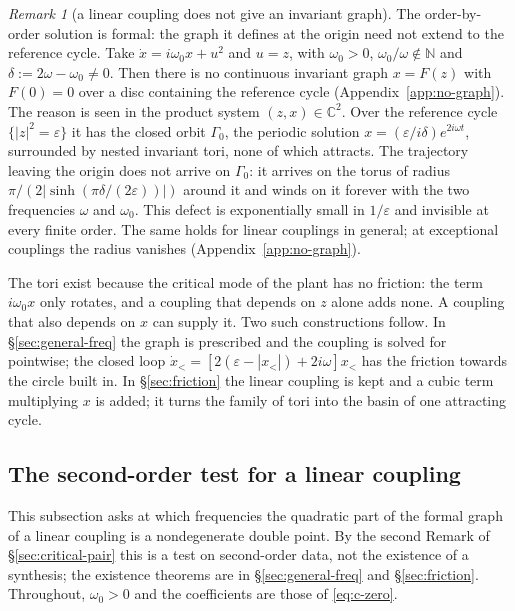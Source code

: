 \documentclass[11pt,reqno]{amsart}
\theoremstyle{plain}
\theoremstyle{definition}
\theoremstyle{remark}
\newtheorem*{remark}{Remark}
\newcommand{\C}{\mathbb{C}}
\begin{document}
\begin{remark}[a linear coupling does not give an invariant graph]\label{rem:no-graph}
The order-by-order solution is formal: the graph it defines at the origin need not extend to
the reference cycle. Take $\dot x=i\omega_0x+u^{2}$ and $u=z$, with $\omega_0>0$,
$\omega_0/\omega\notin\mathbb N$ and $\delta:=2\omega-\omega_0\neq0$. Then there is no continuous invariant
graph $x=F(z)$ with $F(0)=0$ over a disc containing the reference cycle (Appendix~\ref{app:no-graph}).
The reason is seen in the product system $(z,x)\in\C^{2}$. Over the reference cycle $\{|z|^{2}=\varepsilon\}$ it
has the closed orbit $\Gamma_0$, the periodic solution $x=(\varepsilon/i\delta)e^{2i\omega t}$, surrounded by
nested invariant tori, none of which attracts. The trajectory leaving the origin does not arrive on
$\Gamma_0$: it arrives on the torus of radius $\pi/(2|\sinh(\pi\delta/(2\varepsilon))|)$ around it and winds on
it forever with the two frequencies $\omega$ and $\omega_0$. This defect is exponentially small in
$1/\varepsilon$ and invisible at every finite order. The same holds for linear couplings in general; at exceptional couplings the radius vanishes (Appendix~\ref{app:no-graph}).

The tori exist because the critical mode of the plant has no friction: the term $i\omega_0x$ only rotates, and a
coupling that depends on $z$ alone adds none. A coupling that also depends on $x$ can supply it. Two such
constructions follow. In \S\ref{sec:general-freq} the graph is prescribed and the coupling is solved for
pointwise; the closed loop $\dot x_<=[2(\varepsilon-|x_<|)+2i\omega]x_<$ has the friction towards the circle built in. In
\S\ref{sec:friction} the linear coupling is kept and a cubic term multiplying $x$ is added; it turns the
family of tori into the basin of one attracting cycle.
\end{remark}

\subsection{The second-order test for a linear coupling}\label{sec:reachable}
This subsection asks at which frequencies the quadratic part of the formal graph of a linear
coupling is a nondegenerate double point. By the second Remark of \S\ref{sec:critical-pair} this is
a test on second-order data, not the existence of a synthesis; the existence theorems are in
\S\ref{sec:general-freq} and \S\ref{sec:friction}. Throughout, $\omega_0>0$ and the coefficients are those of
\eqref{eq:c-zero}.
\end{document}
